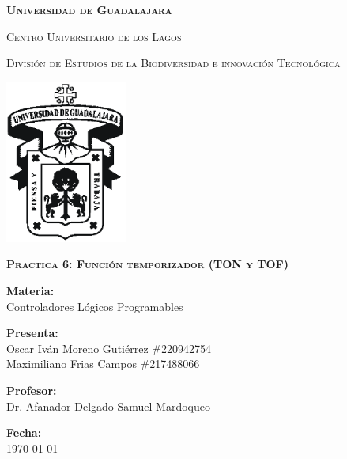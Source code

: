 \documentclass[12pt]{report}
\begin{document}
\setlength{\hoffset}{27 pt} %
\begin{titlepage}
{\centering
{\scshape\bfseries\fontsize{29.16}{34.992}\selectfont Universidad de Guadalajara \par}
\vspace{0.5cm}
{\scshape\Large Centro Universitario de los Lagos \par}
\vspace{1cm}
{\scshape\Large División de Estudios de la Biodiversidad e innovación Tecnológica \par}
\vspace{1cm}
{\graphicspath{{imagenes/Portada}} %
\includegraphics[width=0.3\textwidth]{image.png}\par}
\vspace{1cm}
{\scshape\large\bfseries Practica 6: Función temporizador (TON y TOF) \par}
\vspace{0.5cm}
{\large \textbf{Materia:} \\Controladores Lógicos Programables\par}
\vfill
{\large \textbf{Presenta:} \\Oscar Iván Moreno Gutiérrez \#220942754
\\Maximiliano Frias Campos \#217488066
\par}
\vfill
{\large \textbf{Profesor:} \\Dr. Afanador Delgado Samuel Mardoqueo \par}
\vfill
\vfill
\begin{flushright}
  {\normalsize \textbf {Fecha:} \\ \today}
\end{flushright}
\vfill}
{\large  \par}
\end{titlepage}
\end{document}
